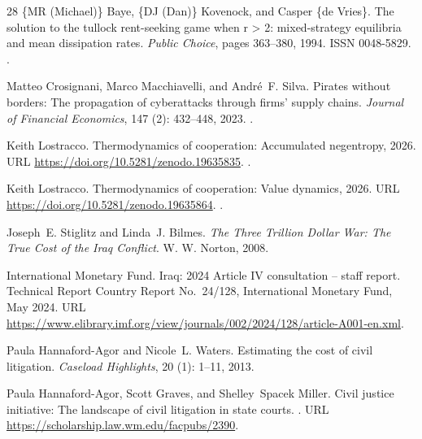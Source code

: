 \documentclass[11pt]{article}
\theoremstyle{plain}
\theoremstyle{definition}
\theoremstyle{remark}
\begin{document}
\begin{thebibliography}{28}
\{MR (Michael)\} Baye, \{DJ (Dan)\} Kovenock, and Casper \{de Vries\}.
\newblock The solution to the tullock rent-seeking game when r > 2:
  mixed-strategy equilibria and mean dissipation rates.
\newblock \emph{Public Choice}, pages 363--380, 1994.
\newblock ISSN 0048-5829.
\newblock {}.

Matteo Crosignani, Marco Macchiavelli, and Andr{\'e}~F. Silva.
\newblock Pirates without borders: The propagation of cyberattacks through
  firms' supply chains.
\newblock \emph{Journal of Financial Economics}, 147 (2):
  432--448, 2023.
\newblock {}.

Keith Lostracco.
\newblock Thermodynamics of cooperation: Accumulated negentropy,
  2026{}.
\newblock URL \url{https://doi.org/10.5281/zenodo.19635835}.
\newblock {}.

Keith Lostracco.
\newblock Thermodynamics of cooperation: Value dynamics, 2026{}.
\newblock URL \url{https://doi.org/10.5281/zenodo.19635864}.
\newblock {}.

Joseph~E. Stiglitz and Linda~J. Bilmes.
\newblock \emph{The Three Trillion Dollar War: The True Cost of the {Iraq}
  Conflict}.
\newblock W. W. Norton, 2008.

{International Monetary Fund}.
\newblock Iraq: 2024 {Article IV} consultation -- staff report.
\newblock Technical Report Country Report No.\ 24/128, International Monetary
  Fund, May 2024.
\newblock URL
  \url{https://www.elibrary.imf.org/view/journals/002/2024/128/article-A001-en.xml}.

Paula Hannaford-Agor and Nicole~L. Waters.
\newblock Estimating the cost of civil litigation.
\newblock \emph{Caseload Highlights}, 20 (1): 1--11, 2013.

Paula Hannaford-Agor, Scott Graves, and Shelley~Spacek Miller.
\newblock Civil justice initiative: The landscape of civil litigation in state
  courts.
.
\newblock URL \url{https://scholarship.law.wm.edu/facpubs/2390}.


\end{thebibliography}
\end{document}
